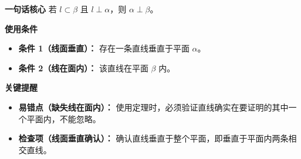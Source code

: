 \begin{summarybox}
	\textbf{\textcolor{CSummary}{一句话核心}}
	若 $l\subset\beta$ 且 $l\perp\alpha$，则 $\alpha\perp\beta$。

	\medskip
	\textbf{\textcolor{CSummary}{使用条件}}
	\begin{itemize}[leftmargin=*, itemsep=0.5em, topsep=0.4em]
		\item \textbf{条件 1（线面垂直）：} 存在一条直线垂直于平面 $\alpha$。
		\item \textbf{条件 2（线在面内）：} 该直线在平面 $\beta$ 内。
	\end{itemize}

	\medskip
	\textbf{\textcolor{CSummary}{关键提醒}}
	\begin{itemize}[leftmargin=*, itemsep=0.5em, topsep=0.4em]
		\item \textbf{易错点（缺失线在面内）：} 使用定理时，必须验证直线确实在要证明的其中一个平面内，不能忽略。
		\item \textbf{检查项（线面垂直确认）：} 确认直线垂直于整个平面，即垂直于平面内两条相交直线。
	\end{itemize}

\end{summarybox}

